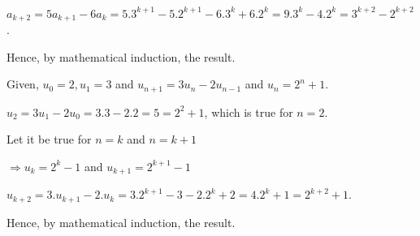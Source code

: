   $a_{k + 2} = 5a_{k + 1} - 6a_k = 5.3^{k + 1} - 5.2^{k + 1} - 6.3^k + 6.2^k = 9.3^k - 4.2^k = 3^{k + 2} -
  2^{k + 2}$.

  Hence, by mathematical induction, the result.
\item Given, $u_0 = 2, u_1 = 3$ and $u_{n + 1} = 3u_n - 2u_{n - 1}$ and $u_n = 2^n + 1$.

  $u_2 = 3u_1 - 2u_0 = 3.3 - 2.2 = 5 = 2^2 + 1$, which is true for $n = 2$.

  Let it be true for $n = k$ and $n = k + 1$

  $\Rightarrow u_k = 2^k - 1$ and $u_{k + 1} = 2^{k + 1} - 1$

  $u_{k + 2} = 3.u_{k + 1} - 2.u_k = 3.2^{k + 1} - 3 - 2.2^k + 2 = 4.2^k + 1 = 2^{k + 2} + 1$.

  Hence, by mathematical induction, the result.
\stopitemize